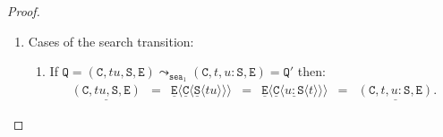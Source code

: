 \documentclass[10pt,a4paper]{article}
\theoremstyle{remark}
\newcommand{\tm}{t}
\newcommand{\tmtwo}{u}
\newcommand{\var}{x}
\newcommand{\Rew}[1]{\rightarrow_{#1}}
\newcommand{\symfont}[1]{\mathtt{#1}}
\newcommand{\sksym}{\symfont{sk}}
\newcommand{\val}{v}
\newcommand{\valtwo}{\val'}
\newcommand{\ctxholep}[1]{\langle #1\rangle}
\newcommand{\sctx}{S}
\newcommand{\sctxp}[1]{\sctx\ctxholep{#1}}
\newcommand{\esub}[2]{[#1{\shortleftarrow}#2]}
\newcommand{\skesub}[2]{\langle#1{\shortleftarrow}#2\rangle}
\newcommand{\reflemma}[1]{Lemma~\ref{l:#1}}
\newcommand{\reflemmaeq}[1]{{L.\ref{l:#1}}}
\newcommand{\env}{\genv}
\newcommand{\envtwo}{\env'}
\newcommand{\genv}{\symfont{E}}
\newcommand{\stack}{\symfont{S}}
\renewcommand{\state}{\symfont{Q}}
\newcommand{\state}{\symfont{Q}}
\newcommand{\statetwo}{\state'}
\newcommand{\decode}[1]{\underline{#1}}
\newcommand{\decodep}[2]{\decode{#1}\ctxholep{#2}}
\newcommand{\cons}{::}
\newcommand{\tomachhole}[1]{\leadsto_{#1}}
\newcommand{\seasym}{\symfont{sea}}
\newcommand{\tomachseaone}{\tomachhole{\seasym_1}}
\newcommand{\chain}{\symfont{C}}
\newcommand{\tomachsk}{\tomachhole{\sksym}}
\newcommand{\tomachss}{\tomachhole{\sssym}}
\newcommand{\tosk}{\Rew{\sksym}}
\newcommand{\sssym}{\symfont{ss}}
\newcommand{\fourstate}[4]{(#1,#2,#3,#4)}
\renewcommand{\cons}{{:}}
\begin{document}
\begin{proof}
\begin{enumerate}
\begin{enumerate}
\item If $\state = \fourstate \chain \var \stack {\env\cons\esub\var\val\cons\envtwo}
	  	\tomachsk 
		\fourstate \chain \var \stack {\env\cons\skesub\var{\val'}\cons\env_\sctx\cons\envtwo}
 = \statetwo$ then:
\[\begin{array}{rllll}
 \decode{\fourstate \chain \var \stack {\env\cons\esub\var\val\cons\envtwo}}
 & = &
 \decodep{\env\cons\esub\var\val\cons\envtwo}{\decodep\chain{\decodep\stack{\var}}}
\\ & = &
 \decodep{\envtwo}{\decodep\env{\decodep\chain{\decodep\stack{\var}}}\esub\var\val}
\\ (\reflemmaeq{skeletal-mam-qual-invariants}.2,3)&\tosk &
 \decodep{\envtwo}{\sctxp{\decodep\env{\decodep\chain{\decodep\stack{\var}}}\skesub\var\valtwo}}
\\ & = &
 \decodep{\env\cons\env_\sctx\cons\skesub\var\valtwo\cons\envtwo}{\decodep\chain{\decodep\stack{\var}}}
 & = &		
	\decode{\fourstate \chain \var \stack {\env\cons\skesub\var{\val'}\cons\env_\sctx\cons\envtwo}}.
\end{array}\]
The $\sksym$ steps applies because:
\begin{enumerate}
\item As in the previous case, the contextual chain read-back invariant (\reflemmaeq{skeletal-mam-qual-invariants}.3) ensures that the step takes place in an evaluation context;
\item The well-bound invariant (\reflemma{skeletal-mam-qual-invariants}.2) ensures that there is only one environment entry on $\var$ in $\state$, so that there are no entries bounding $\var$ in $\env$ (if there were another entry $\esub\var\tm$ in $\env$ then the occurrence of $\var$ in $\esub\var\val$ would violate the invariant).
\end{enumerate}

\item The case $\tomachss$ is analogous to the $\sksym$ case.
\end{enumerate}

\item Cases of the search transition:
\begin{enumerate}
\item If $\state = \fourstate \chain {\tm\tmtwo} \stack \env
	  	\tomachseaone
	  	\fourstate \chain \tm {\tmtwo\cons\stack} \env = \statetwo$ then:
\[\begin{array}{lllllllll}
 \decode{\fourstate \chain {\tm\tmtwo} \stack \env}
 & = &
 \decodep{\env}{\decodep\chain{\decodep\stack{\tm\tmtwo}}}
& = &
 \decodep{\env}{\decodep\chain{\decodep{\tmtwo\cons\stack}\tm}}
 & = &		
	\decode{\fourstate \chain \tm {\tmtwo\cons\stack} \env}.
\end{array}\]


\end{enumerate}
\end{enumerate}
\end{proof}
\end{document}
